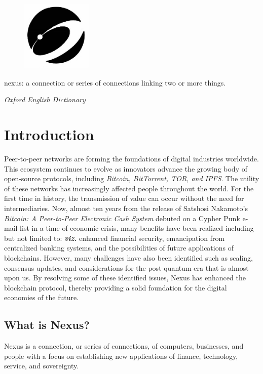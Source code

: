 \documentclass[11pt]{article}
\begin{document}
\begin{figure}
    \centering
    \vspace{-25pt}
    \hspace{-15pt}
    \includegraphics[width=0.30\textwidth]{./images/IMG_1228.JPG}
\end{figure}

\epigraph{nexus: a connection or series of connections linking two or more things.}{\textit{\footnotesize{Oxford English Dictionary}}}

\section{Introduction}

Peer-to-peer networks are forming the foundations of digital industries worldwide.
This ecosystem continues to evolve as innovators advance the growing body of open-source protocols, including \textit{Bitcoin, BitTorrent, TOR, and IPFS}.
The utility of these networks has increasingly affected people throughout the world.
For the first time in history, the transmission of value can occur without the need for intermediaries.
Now, almost ten years from the release of Satshosi Nakamoto's \textit{Bitcoin: A Peer-to-Peer Electronic Cash System} \cite{bitcoin} debuted on a Cypher Punk e-mail list in a time of economic crisis, many benefits have been realized including but not limited to: \textbf{\textit{viz.}} enhanced financial security, emancipation from centralized banking systems, and the possibilities of future applications of blockchains. However, many challenges have also been identified such as scaling, consensus updates, and considerations for the post-quantum era that is almost upon us.
By resolving some of these identified issues, Nexus has enhanced the blockchain protocol, thereby providing a solid foundation for the digital economies of the future. 
\bigskip

\subsection{What is Nexus?}
Nexus is a connection, or series of connections, of computers, businesses, and people with a focus on establishing new applications of finance, technology, service, and sovereignty.  
\end{document}
